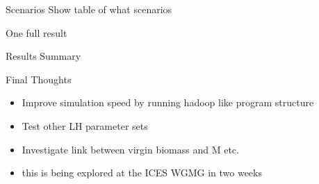 \documentclass{beamer}
\begin{document}

\begin{withoutheadline}
\begin{frame}{Scenarios}
Show table of what scenarios
\end{frame}
\end{withoutheadline}


\begin{withoutheadline}
\begin{frame}{One full result}
\end{frame}
\end{withoutheadline}


\begin{withoutheadline}
\begin{frame}{Results Summary}
\end{frame}
\end{withoutheadline}


\begin{frame}{Final Thoughts}
  \begin{itemize}
    \item Improve simulation speed by running hadoop like program structure
    \item Test other LH parameter sets
    \item Investigate link between virgin biomass and M etc.
    \item this is being explored at the ICES WGMG in two weeks  
  \end{itemize}
\end{frame}

\end{document}
